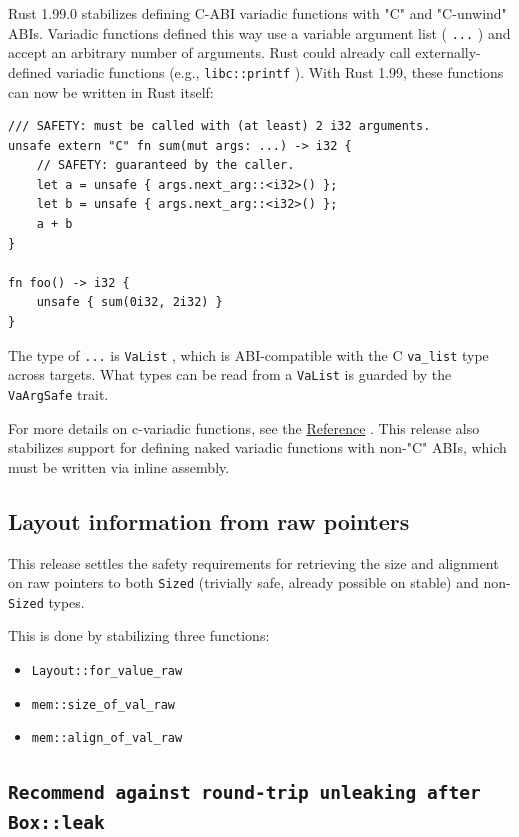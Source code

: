 \documentclass[11pt,a4paper]{article}
\begin{document}
Rust 1.99.0 stabilizes defining C-ABI variadic functions with "C" and "C-unwind" ABIs. Variadic functions defined this way use a variable argument list ( \texttt{...} ) and accept an arbitrary number of arguments. Rust could already call externally-defined variadic functions (e.g., \texttt{libc::printf} ). With Rust 1.99, these functions can now be written in Rust itself:

\begin{verbatim}
/// SAFETY: must be called with (at least) 2 i32 arguments.
unsafe extern "C" fn sum(mut args: ...) -> i32 {
    // SAFETY: guaranteed by the caller.
    let a = unsafe { args.next_arg::<i32>() };
    let b = unsafe { args.next_arg::<i32>() };
    a + b
}

fn foo() -> i32 {
    unsafe { sum(0i32, 2i32) }
}
\end{verbatim}

The type of \texttt{...} is \texttt{VaList} , which is ABI-compatible with the C \texttt{va_list} type across targets. What types can be read from a \texttt{VaList} is guarded by the \texttt{VaArgSafe} trait.

For more details on c-variadic functions, see the \href{https://doc.rust-lang.org/reference/items/functions.html\#c-variadic-functions}{Reference} . This release also stabilizes support for defining naked variadic functions with non-"C" ABIs, which must be written via inline assembly.

\subsection{Layout information from raw pointers}

This release settles the safety requirements for retrieving the size and alignment on raw pointers to both \texttt{Sized} (trivially safe, already possible on stable) and non- \texttt{Sized} types.

This is done by stabilizing three functions:

\begin{itemize}
\item \texttt{Layout::for_value_raw}
\item \texttt{mem::size_of_val_raw}
\item \texttt{mem::align_of_val_raw}
\end{itemize}

\subsection{\texttt{Recommend against round-trip unleaking after Box::leak}}
\end{document}
